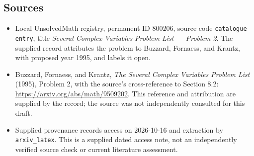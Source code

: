 \documentclass[11pt]{article}
\begin{document}
\subsection{Sources}
\begin{itemize}
\item Local UnsolvedMath registry, permanent ID \(800206\), source code \texttt{catalogue entry}, title \emph{Several Complex Variables Problem List --- Problem 2}. The supplied record attributes the problem to Buzzard, Fornaess, and Krantz, with proposed year 1995, and labels it open.
\item Buzzard, Fornaess, and Krantz, \emph{The Several Complex Variables Problem List} (1995), Problem 2, with the source's cross-reference to Section 8.2: \url{https://arxiv.org/abs/math/9509202}. This reference and attribution are supplied by the record; the source was not independently consulted for this draft.
\item Supplied provenance records access on 2026-10-16 and extraction by \texttt{arxiv\_latex}. This is a supplied dated access note, not an independently verified source check or current literature assessment.
\end{itemize}
\end{document}
